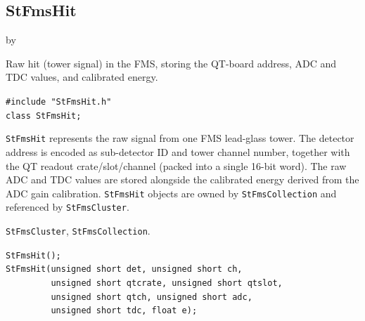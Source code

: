 \documentclass[twoside]{article}
\newcommand{\entrylabel}[1]{\mbox{\textbf{{#1}}}\hfil}%
\newenvironment{entry}
{\begin{list}{}%
    {\renewcommand{\makelabel}{\entrylabel}%
     \setlength{\labelwidth}{90pt}%
     \setlength{\leftmargin}{\labelwidth}
     \advance\leftmargin by \labelsep%
      }%
    }%
  {\end{list}}
\newcommand{\Entrylabel}[1]%
{\raisebox{0pt}[1ex][0pt]{\makebox[\labelwidth][l]%
    {\parbox[t]{\labelwidth}{\hspace{0pt}\textbf{{#1}}}}}}
\newenvironment{Entry}%
{\renewcommand{\entrylabel}{\Entrylabel}\begin{entry}}%
  {\end{entry}}
\begin{document}
\subsection{StFmsHit}
\label{sec:StFmsHit}
\begin{Entry}
\item[Summary]
    Raw hit (tower signal) in the FMS, storing the QT-board address, ADC and
    TDC values, and calibrated energy.

\item[Synopsis]
    \verb+#include "StFmsHit.h"+\\
    \verb+class StFmsHit;+\\

\item[Description]
    \texttt{StFmsHit} represents the raw signal from one FMS lead-glass tower.
    The detector address is encoded as sub-detector ID and tower channel number,
    together with the QT readout crate/slot/channel (packed into a single
    16-bit word).  The raw ADC and TDC values are stored alongside the
    calibrated energy derived from the ADC gain calibration.
    \texttt{StFmsHit} objects are owned by \texttt{StFmsCollection} and
    referenced by \texttt{StFmsCluster}.

\item[Related Classes]
    \texttt{StFmsCluster}, \texttt{StFmsCollection}.

\item[Public\\ Constructors]
    \verb+StFmsHit();+\\
    \verb+StFmsHit(unsigned short det, unsigned short ch,+\\
    \verb+         unsigned short qtcrate, unsigned short qtslot,+\\
    \verb+         unsigned short qtch, unsigned short adc,+\\
    \verb+         unsigned short tdc, float e);+\\


\end{Entry}
\end{document}
